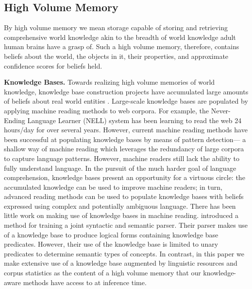 \documentclass[jair,twoside,11pt,theapa]{article}
\renewcommand{\paragraph}[1]{\noindent\textbf{#1.}}
\begin{document}
% 

\subsection{ High Volume Memory}
By high volume memory we mean storage capable of storing and retrieving   comprehensive world
knowledge akin to the breadth of  world knowledge   adult human brains have a grasp of. Such a high volume memory, therefore,  contains beliefs
about the world, the objects in it,   their properties, and  approximate confidence scores for beliefs held.

\paragraph{Knowledge Bases} Towards realizing high volume memories of world knowledge, knowledge base construction projects have accumulated large amounts of beliefs about real world entities  \cite{MitchellCHTBCMG15,suchanek2007yago,Bollacker2008}. Large-scale knowledge bases are populated by applying machine reading methods to  web corpora.  For example, the  Never-Ending
Language Learner (NELL)  system  has been learning to read the web 24 hours/day for over several years. However,  current machine reading methods have been successful at populating knowledge bases  by means of pattern detection--- a shallow way of machine reading which leverages the redundancy of large corpora to capture language patterns. However, machine readers still lack the ability to fully understand  language. In the pursuit of the much harder goal of language comprehension, knowledge bases present an opportunity for a virtuous circle:  the accumulated knowledge can be used to improve machine readers; in turn, advanced reading methods can be used to populate knowledge bases with beliefs expressed using complex and potentially ambiguous language. There has been little work on making use of knowledge bases in machine reading. \cite{conf/acl/KrishnamurthyM14} introduced a method for  training a joint syntactic
and semantic parser. Their parser makes use of a knowledge base to produce  logical forms containing knowledge base predicates. However, their use of the knowledge base is limited to unary predicates  to determine  semantic types of concepts. In contrast,  in this paper we make extensive use of  a   knowledge base augmented by linguistic resources and corpus statistics  as the content  of a high volume memory  that our knowledge-aware methods have access to at inference time.
\end{document}
